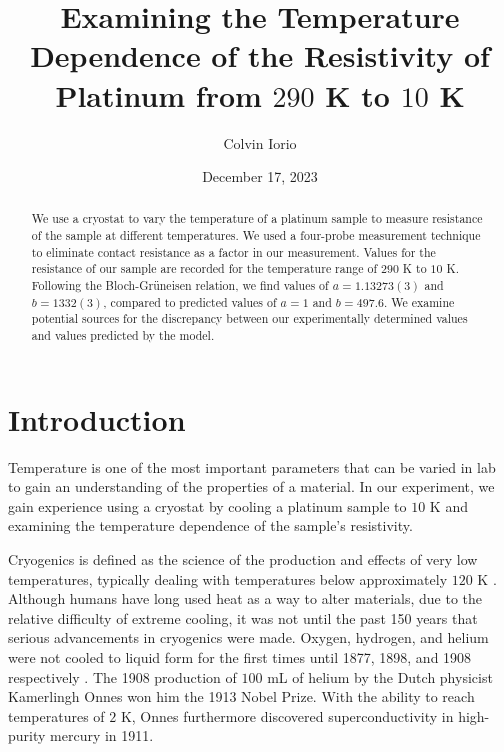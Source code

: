 \documentclass[11pt,letterpaper]{article}
\begin{document}
\title{Examining the Temperature Dependence of the Resistivity of Platinum from $290$ K to $10$ K}

\author{Colvin Iorio}

\date{December 17, 2023}
\maketitle


\begin{abstract}
    We use a cryostat to vary the temperature of a platinum sample to measure resistance of the sample at different temperatures. We used a four-probe measurement technique to eliminate contact resistance as a factor in our measurement. Values for the resistance of our sample are recorded for the temperature range of $290$ K to $10$ K. Following the Bloch-Grüneisen relation, we find values of $a = 1.13273(3)$ and $b = 1332(3)$, compared to predicted values of $a = 1$ and $b = 497.6$. We examine potential sources for the discrepancy between our experimentally determined values and values predicted by the model.
\end{abstract}


\section{Introduction}\label{sec intro}

Temperature is one of the most important parameters that can be varied in lab to gain an understanding of the properties of a material. In our experiment, we gain experience using a cryostat by cooling a platinum sample to $10$ K and examining the temperature dependence of the sample's resistivity.

Cryogenics is defined as the science of the production and effects of very low temperatures, typically dealing with temperatures below approximately $120$ K \cite{Radebaugh}. Although humans have long used heat as a way to alter materials, due to the relative difficulty of extreme cooling, it was not until the past 150 years that serious advancements in cryogenics were made. Oxygen, hydrogen, and helium were not cooled to liquid form for the first times until 1877, 1898, and 1908 respectively \cite{Radebaugh2}. The 1908 production of $100$ mL of helium by the Dutch physicist Kamerlingh Onnes won him the 1913 Nobel Prize. With the ability to reach temperatures of $2$ K, Onnes furthermore discovered superconductivity in high-purity mercury in 1911.
\end{document}
